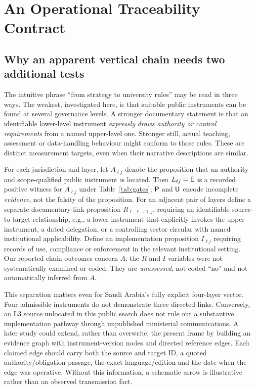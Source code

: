 \section{An Operational Traceability Contract}
\subsection{Why an apparent vertical chain needs two additional tests}
The intuitive phrase ``from strategy to university rules'' may be read in three ways. The weakest, investigated here, is that suitable public instruments can be found at several governance levels. A stronger documentary statement is that an identifiable lower-level instrument \emph{expressly draws authority or control requirements} from a named upper-level one. Stronger still, actual teaching, assessment or data-handling behaviour might conform to those rules. These are distinct measurement targets, even when their narrative descriptions are similar.

For each jurisdiction and layer, let $A_{\ell j}$ denote the proposition that an authority- and scope-qualified public instrument is located. Then $L_{\ell j}=\textsf{E}$ is a recorded positive witness for $A_{\ell j}$ under Table~\ref{tab:gates}; $\textsf{P}$ and $\textsf{U}$ encode incomplete \emph{evidence}, not the falsity of the proposition. For an adjacent pair of layers define a separate documentary-link proposition $R_{\ell,\ell+1,j}$, requiring an identifiable source-to-target relationship, e.g., a lower instrument that explicitly invokes the upper instrument, a dated delegation, or a controlling sector circular with named institutional applicability. Define an implementation proposition $I_{\ell j}$ requiring records of use, compliance or enforcement in the relevant institutional setting. Our reported chain outcomes concern $A$; the $R$ and $I$ variables were not systematically examined or coded. They are \emph{unassessed}, not coded ``no'' and not automatically inferred from $A$.

This separation matters even for Saudi Arabia's fully explicit four-layer vector. Four admissible instruments do not demonstrate three directed links. Conversely, an L3 source unlocated in this public search does not rule out a substantive implementation pathway through unpublished ministerial communications. A later study could extend, rather than overwrite, the present frame by building an evidence graph with instrument-version nodes and directed reference edges. Each claimed edge should carry both the source and target ID, a quoted authority/obligation passage, the exact language/edition and the date when the edge was operative. Without this information, a schematic arrow is illustrative rather than an observed transmission fact.

